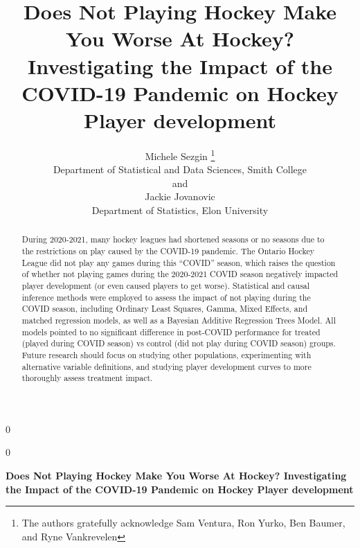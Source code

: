 \documentclass[12pt]{article}
\newcommand{\blind}{0}
\begin{document}
\def\spacingset#1{\renewcommand{\baselinestretch}%
{#1}\small\normalsize} \spacingset{1}



\blind
{
  \title{\bf Does Not Playing Hockey Make You Worse At Hockey?
Investigating the Impact of the COVID-19 Pandemic on Hockey Player
development}

  \author{
        Michele Sezgin \thanks{The authors gratefully acknowledge Sam
Ventura, Ron Yurko, Ben Baumer, and Ryne Vankrevelen} \\
    Department of Statistical and Data Sciences, Smith College\\
     and \\     Jackie Jovanovic \\
    Department of Statistics, Elon University\\
      }
  \maketitle
} \fi

\blind
{
  \bigskip
  \bigskip
  \bigskip
  \begin{center}
    {\LARGE\bf Does Not Playing Hockey Make You Worse At Hockey?
Investigating the Impact of the COVID-19 Pandemic on Hockey Player
development}
  \end{center}
  \medskip
} \fi

\bigskip
\begin{abstract}
During 2020-2021, many hockey leagues had shortened seasons or no
seasons due to the restrictions on play caused by the COVID-19 pandemic.
The Ontario Hockey League did not play any games during this ``COVID''
season, which raises the question of whether not playing games during
the 2020-2021 COVID season negatively impacted player development (or
even caused players to get worse). Statistical and causal inference
methods were employed to assess the impact of not playing during the
COVID season, including Ordinary Least Squares, Gamma, Mixed Effects,
and matched regression models, as well as a Bayesian Additive Regression
Trees Model. All models pointed to no significant difference in
post-COVID performance for treated (played during COVID season) vs
control (did not play during COVID season) groups. Future research
should focus on studying other populations, experimenting with
alternative variable definitions, and studying player development curves
to more thoroughly assess treatment impact.
\end{abstract}
\end{document}
